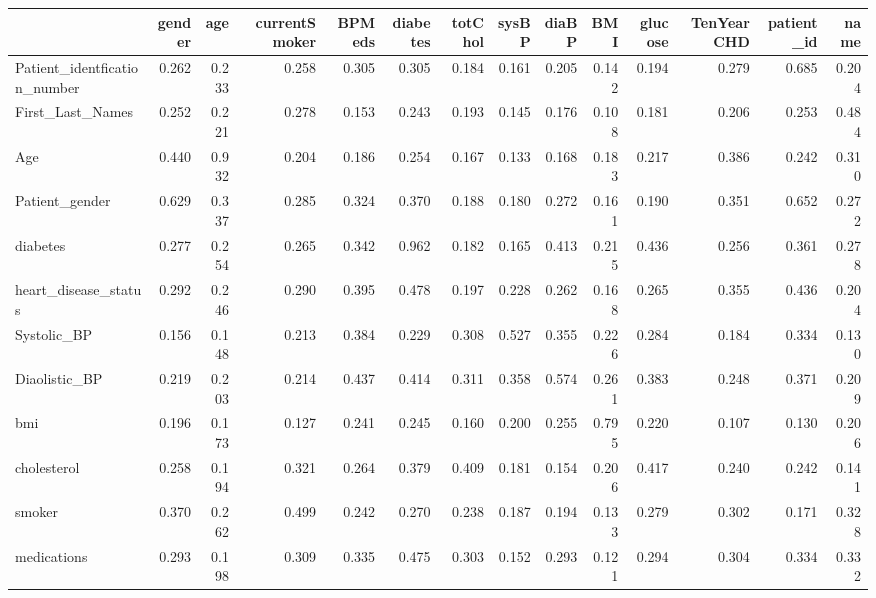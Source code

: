 \begin{tabular}{lrrrrrrrrrrrrr}
\toprule
 & gender & age & currentSmoker & BPMeds & diabetes & totChol & sysBP & diaBP & BMI & glucose & TenYearCHD & patient_id & name \\
\midrule
Patient_identfication_number & 0.262 & 0.233 & 0.258 & 0.305 & 0.305 & 0.184 & 0.161 & 0.205 & 0.142 & 0.194 & 0.279 & 0.685 & 0.204 \\
First_Last_Names & 0.252 & 0.221 & 0.278 & 0.153 & 0.243 & 0.193 & 0.145 & 0.176 & 0.108 & 0.181 & 0.206 & 0.253 & 0.484 \\
Age & 0.440 & 0.932 & 0.204 & 0.186 & 0.254 & 0.167 & 0.133 & 0.168 & 0.183 & 0.217 & 0.386 & 0.242 & 0.310 \\
Patient_gender & 0.629 & 0.337 & 0.285 & 0.324 & 0.370 & 0.188 & 0.180 & 0.272 & 0.161 & 0.190 & 0.351 & 0.652 & 0.272 \\
diabetes & 0.277 & 0.254 & 0.265 & 0.342 & 0.962 & 0.182 & 0.165 & 0.413 & 0.215 & 0.436 & 0.256 & 0.361 & 0.278 \\
heart_disease_status & 0.292 & 0.246 & 0.290 & 0.395 & 0.478 & 0.197 & 0.228 & 0.262 & 0.168 & 0.265 & 0.355 & 0.436 & 0.204 \\
Systolic_BP & 0.156 & 0.148 & 0.213 & 0.384 & 0.229 & 0.308 & 0.527 & 0.355 & 0.226 & 0.284 & 0.184 & 0.334 & 0.130 \\
Diaolistic_BP & 0.219 & 0.203 & 0.214 & 0.437 & 0.414 & 0.311 & 0.358 & 0.574 & 0.261 & 0.383 & 0.248 & 0.371 & 0.209 \\
bmi & 0.196 & 0.173 & 0.127 & 0.241 & 0.245 & 0.160 & 0.200 & 0.255 & 0.795 & 0.220 & 0.107 & 0.130 & 0.206 \\
cholesterol & 0.258 & 0.194 & 0.321 & 0.264 & 0.379 & 0.409 & 0.181 & 0.154 & 0.206 & 0.417 & 0.240 & 0.242 & 0.141 \\
smoker & 0.370 & 0.262 & 0.499 & 0.242 & 0.270 & 0.238 & 0.187 & 0.194 & 0.133 & 0.279 & 0.302 & 0.171 & 0.328 \\
medications & 0.293 & 0.198 & 0.309 & 0.335 & 0.475 & 0.303 & 0.152 & 0.293 & 0.121 & 0.294 & 0.304 & 0.334 & 0.332 \\
\bottomrule
\end{tabular}

